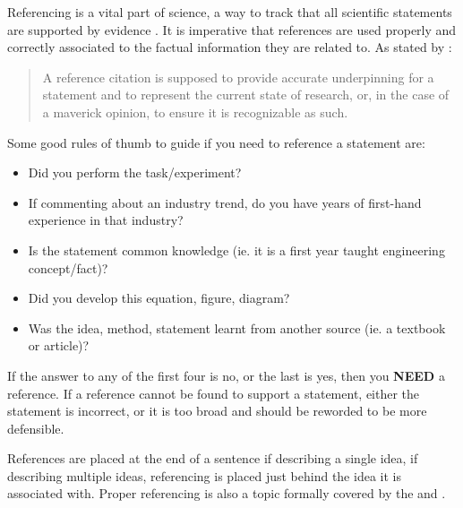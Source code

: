 Referencing is a vital part of science, a way to track that all scientific statements are supported by evidence \cite{referncingVirtues}. 
It is imperative that references are used properly and correctly associated to the factual information they are related to. 
As stated by \citeauthor{referncingVirtues} \cite{referncingVirtues}:
\begin{quotation}
	\noindent
	A reference citation is supposed to provide accurate underpinning for a statement and to represent the current state of research, or, in the case of a maverick opinion, to ensure it is recognizable as such. \cite{referncingVirtues}
\end{quotation} 

\noindent
Some good rules of thumb to guide if you need to reference a statement are: 
\begin{itemize}
	\item Did you perform the task/experiment?
	\item If commenting about an industry trend, do you have years of first-hand experience in that industry?
	\item Is the statement common knowledge (ie. it is a first year taught engineering concept/fact)?
	\item Did you develop this equation, figure, diagram? 
	\item Was the idea, method, statement learnt from another source (ie. a textbook or article)?
\end{itemize}
\noindent
If the answer to any of the first four is no, or the last is yes, then you \textbf{NEED} a reference. 
If a reference cannot be found to support a statement, either the statement is incorrect, or it is too broad and should be reworded to be more defensible. 

References are placed at the end of a sentence if describing a single idea, if describing multiple ideas, referencing is placed just behind the idea it is associated with. 
Proper referencing is also a topic formally covered by the \citeauthor{writingUofC} \cite{writingUofC} and \citeauthor{writingCoursesUofC} \cite{writingCoursesUofC}.
